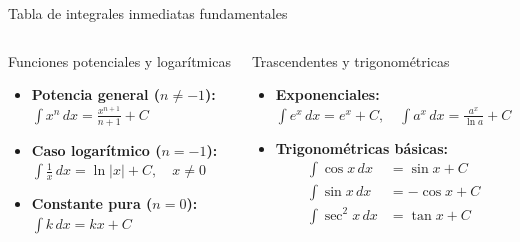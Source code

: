 \documentclass[aspectratio=169,11pt]{beamer}
\begin{document}
\begin{frame}{Tabla de integrales inmediatas fundamentales}
\scriptsize
\begin{columns}[T,onlytextwidth]
\begin{block}{Funciones potenciales y logarítmicas}
\begin{itemize}[itemsep=2pt]
  \item \textbf{Potencia general ($n\neq -1$):}
  \\[1pt]
  $\displaystyle\int x^n\,dx = \frac{x^{n+1}}{n+1} + C$
  \item \textbf{Caso logarítmico ($n=-1$):}
  \\[1pt]
  $\displaystyle\int \frac{1}{x}\,dx = \ln|x| + C, \quad x\neq 0$
  \item \textbf{Constante pura ($n=0$):}
  \\[1pt]
  $\displaystyle\int k\,dx = k x + C$
\end{itemize}
\end{block}

\begin{block}{Trascendentes y trigonométricas}
\begin{itemize}[itemsep=2pt]
  \item \textbf{Exponenciales:}
  \\[1pt]
  $\displaystyle\int e^x\,dx = e^x + C, \quad \int a^x\,dx = \frac{a^x}{\ln a} + C$
  \item \textbf{Trigonométricas básicas:}
  \begin{align*}
    \int \cos x\,dx &= \sin x + C \\
    \int \sin x\,dx &= -\cos x + C \\
    \int \sec^2 x\,dx &= \tan x + C
  \end{align*}
\end{itemize}
\end{block}
\end{columns}
\end{frame}
\end{document}
